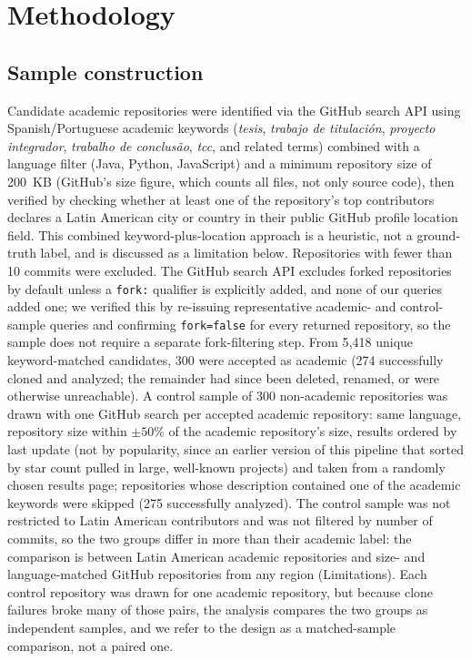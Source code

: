 \documentclass{cleiej}
\begin{document}
\section{Methodology}

\subsection{Sample construction}
Candidate academic repositories were identified via the GitHub search API using Spanish/Portuguese academic keywords (\emph{tesis}, \emph{trabajo de titulación}, \emph{proyecto integrador}, \emph{trabalho de conclusão}, \emph{tcc}, and related terms) combined with a language filter (Java, Python, JavaScript) and a minimum repository size of 200~KB (GitHub's size figure, which counts all files, not only source code), then verified by checking whether at least one of the repository's top contributors declares a Latin American city or country in their public GitHub profile location field. This combined keyword-plus-location approach is a heuristic, not a ground-truth label, and is discussed as a limitation below. Repositories with fewer than 10 commits were excluded. The GitHub search API excludes forked repositories by default unless a \texttt{fork:} qualifier is explicitly added, and none of our queries added one; we verified this by re-issuing representative academic- and control-sample queries and confirming \texttt{fork=false} for every returned repository, so the sample does not require a separate fork-filtering step. From 5{,}418 unique keyword-matched candidates, 300 were accepted as academic (274 successfully cloned and analyzed; the remainder had since been deleted, renamed, or were otherwise unreachable). A control sample of 300 non-academic repositories was drawn with one GitHub search per accepted academic repository: same language, repository size within $\pm 50\%$ of the academic repository's size, results ordered by last update (not by popularity, since an earlier version of this pipeline that sorted by star count pulled in large, well-known projects) and taken from a randomly chosen results page; repositories whose description contained one of the academic keywords were skipped (275 successfully analyzed). The control sample was not restricted to Latin American contributors and was not filtered by number of commits, so the two groups differ in more than their academic label: the comparison is between Latin American academic repositories and size- and language-matched GitHub repositories from any region (Limitations). Each control repository was drawn for one academic repository, but because clone failures broke many of those pairs, the analysis compares the two groups as independent samples, and we refer to the design as a matched-sample comparison, not a paired one.
\end{document}
